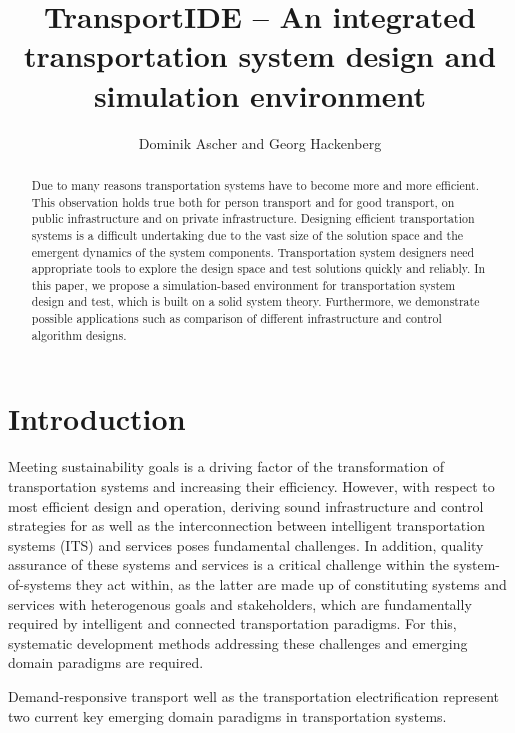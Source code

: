 \documentclass{IEEEtran}
\begin{document}
    \title{\textbf{TransportIDE} -- An integrated transportation system design and simulation environment}
    \author{Dominik Ascher and Georg Hackenberg}
    \maketitle
    
    \begin{abstract}
        Due to many reasons transportation systems have to become more and more efficient.
        This observation holds true both for person transport and for good transport, on public infrastructure and on private infrastructure.
        Designing efficient transportation systems is a difficult undertaking due to the vast size of the solution space and the emergent dynamics of the system components.
        Transportation system designers need appropriate tools to explore the design space and test solutions quickly and reliably.
        In this paper, we propose a simulation-based environment for transportation system design and test, which is built on a solid system theory.
        Furthermore, we demonstrate possible applications such as comparison of different infrastructure and control algorithm designs.
    \end{abstract}
    
    \section{Introduction}
    \label{sec:intro}
    Meeting sustainability goals \cite{sachs2019six} is a driving factor of the transformation of transportation systems and increasing their efficiency. However, with respect to most efficient design and operation, deriving sound infrastructure and control strategies for as well as the interconnection between intelligent transportation systems (ITS) and services poses fundamental challenges. In addition, quality assurance of these systems and services is a critical challenge within the system-of-systems they act within, as the latter are made up of constituting systems and services with heterogenous goals and stakeholders, which are fundamentally required by intelligent and connected transportation paradigms. For this, systematic development methods addressing these challenges and emerging domain paradigms are required.    
    
    Demand-responsive transport \cite{brake_demand_2004} well as the transportation electrification \cite{pereirinha2018main} represent two current key emerging domain paradigms in transportation systems. 
    
\end{document}
